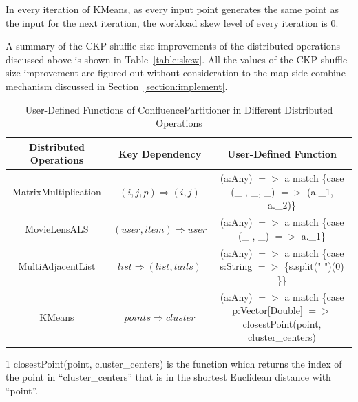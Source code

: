 \documentclass[10pt,journal,compsoc]{IEEEtran}
\begin{document}
In every iteration of KMeans, as every input point generates the same point as the input for the next iteration, the workload skew level of every iteration is 0. 


A summary of the CKP shuffle size improvements of the distributed operations discussed above is shown in Table~\ref{table:skew}.
All the values of the CKP shuffle size improvement are figured out without consideration to the map-side combine mechanism discussed in Section~\ref{section:implement}.


\begin{table}[!t]
\begin{threeparttable}[b]
\renewcommand{\arraystretch}{1}
\caption{User-Defined Functions of ConfluencePartitioner in Different Distributed Operations}
\label{table:code}
\centering
\begin{tabularx}{0.95\textwidth}{ c || c |c  }
\hline
\textbf{Distributed Operations} & \textbf{Key Dependency} & \textbf{User-Defined Function} \\
\hline
MatrixMultiplication & $(i,j,p) \Rightarrow (i,j)$ & (a:Any) $=>$ a match \{case (\_ , \_, \_) $=>$ (a.\_1, a.\_2)\}\\
\hline
MovieLensALS  &$(user,item) \Rightarrow user$ & (a:Any) $=>$ a match \{case (\_ , \_) $=>$ a.\_1\} \\%
\hline
MultiAdjacentList  & $list \Rightarrow (list, tails)$ & (a:Any) $=>$ a match \{case s:String $=>$ \{s.split(" ")(0) \}\}\\
\hline
KMeans & $points \Rightarrow cluster$ & (a:Any) $=>$ a match \{case p:Vector[Double] $=>$ closestPoint(point, cluster\_centers)\tnote{1}\\
\hline
\end{tabularx}
\begin{tablenotes}
    \item[1] closestPoint(point, cluster\_centers) is the function which returns the index of the point in ``cluster\_centers'' that is in the shortest Euclidean distance with ``point''.
  \end{tablenotes}
\end{threeparttable}
\end{table}
\end{document}
